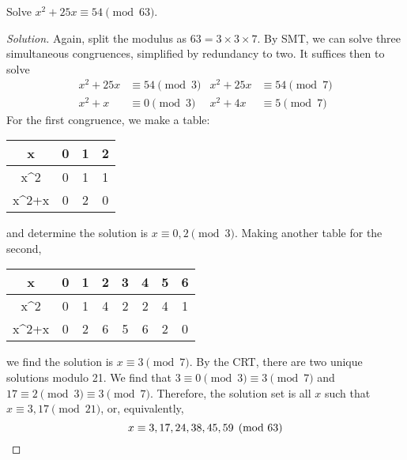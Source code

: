 \documentclass{agony}
\begin{document}
\question Solve $x^2 + 25x \equiv 54 \pmod{63}$.
\begin{proof}[Solution]
  Again, split the modulus as $63 = 3 \times 3 \times 7$.
  By SMT, we can solve three simultaneous congruences, simplified by redundancy to two.
  It suffices then to solve
  \begin{align*}
    x^2 + 25x & \equiv 54 \pmod{3} & x^2 + 25x & \equiv 54 \pmod{7} \\
    x^2 + x   & \equiv 0 \pmod{3}  & x^2 + 4x  & \equiv 5 \pmod{7}
  \end{align*}
  For the first congruence, we make a table:
  \begin{center}
    \begin{tabular}{C|C|C|C}
      x      & 0 & 1 & 2 \\ \hline
      x^2    & 0 & 1 & 1 \\
      x^2+x  & 0 & 2 & 0
    \end{tabular}
  \end{center}
  and determine the solution is $x \equiv 0,2 \pmod{3}$.
  Making another table for the second,
  \begin{center}
    \begin{tabular}{C|C|C|C|C|C|C|C}
      x      & 0 & 1 & 2 & 3 & 4 & 5 & 6 \\ \hline
      x^2    & 0 & 1 & 4 & 2 & 2 & 4 & 1 \\
      x^2+x  & 0 & 2 & 6 & 5 & 6 & 2 & 0
    \end{tabular}
  \end{center}
  we find the solution is $x \equiv 3 \pmod{7}$.
  By the CRT, there are two unique solutions modulo 21.
  We find that $3 \equiv 0 \pmod{3} \equiv 3 \pmod{7}$ and $17 \equiv 2 \pmod{3} \equiv 3 \pmod{7}$.
  Therefore, the solution set is all $x$ such that $x \equiv 3,17 \pmod{21}$, or, equivalently,
  \[ x \equiv 3,17,24,38,45,59 \pmod{63} \qedhere \]
\end{proof}
\end{document}

